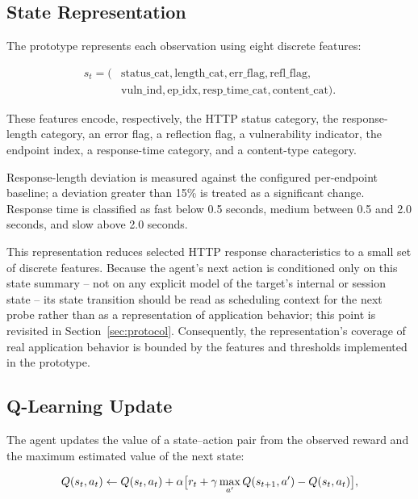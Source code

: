 \documentclass[conference, a4paper]{IEEEtran}
\begin{document}
\subsection{State Representation}

The prototype represents each observation using eight discrete
features:

\begin{equation}
\begin{split}
s_t = (&\text{status\_cat},
\text{length\_cat},
\text{err\_flag},
\text{refl\_flag},\\
&\text{vuln\_ind},
\text{ep\_idx},
\text{resp\_time\_cat},
\text{content\_cat}).
\end{split}
\label{eq:state}
\end{equation}

These features encode, respectively, the HTTP status category,
the response-length category, an error flag, a reflection flag, a
vulnerability indicator, the endpoint index, a response-time
category, and a content-type category.

Response-length deviation is measured against the configured
per-endpoint baseline; a deviation greater than 15\% is treated as
a significant change. Response time is classified as fast below
0.5 seconds, medium between 0.5 and 2.0 seconds, and slow above
2.0 seconds.

This representation reduces selected HTTP response characteristics
to a small set of discrete features. Because the agent's next
action is conditioned only on this state summary -- not on any
explicit model of the target's internal or session state -- its
state transition should be read as scheduling context for the next
probe rather than as a representation of application behavior; this
point is revisited in Section~\ref{sec:protocol}. Consequently, the
representation's coverage of real application behavior is bounded
by the features and thresholds implemented in the prototype.

\subsection{Q-Learning Update}

The agent updates the value of a state--action pair from the
observed reward and the maximum estimated value of the next state:

\begin{equation}
\footnotesize
Q(s_t,a_t) \leftarrow Q(s_t,a_t) + \alpha \big[ r_t + \gamma \max_{a'} Q(s_{t+1},a') - Q(s_t,a_t) \big],
\label{eq:ql}
\end{equation}
\end{document}
